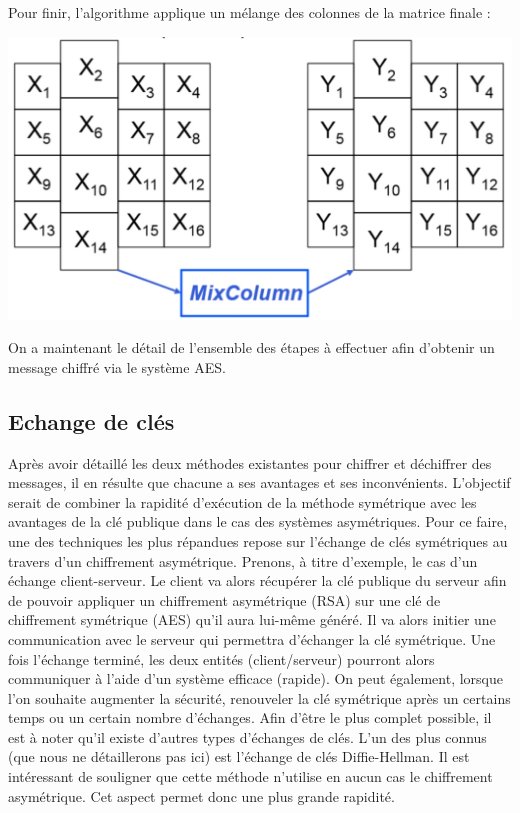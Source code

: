 \documentclass[letterpaper]{article}
\begin{document}
Pour finir, l'algorithme applique un mélange des colonnes de la matrice finale : 
\begin{center}
\includegraphics[scale=0.17]{image4}\\
\end{center}
On a maintenant le détail de l'ensemble des étapes à effectuer afin d'obtenir un message chiffré via le système AES.

\subsection{Echange de clés}
Après avoir détaillé les deux méthodes existantes pour chiffrer et déchiffrer des messages, il en résulte que chacune a ses avantages et ses inconvénients. L'objectif serait de combiner la rapidité d'exécution de la méthode symétrique avec les avantages de la clé publique dans le cas des systèmes asymétriques. Pour ce faire, une des techniques les plus répandues repose sur l'échange de clés symétriques au travers d'un chiffrement asymétrique. Prenons, à titre d'exemple, le cas d'un échange client-serveur. Le client va alors récupérer la clé publique du serveur afin de pouvoir appliquer un chiffrement asymétrique (RSA) sur une clé de chiffrement symétrique (AES) qu'il aura lui-même généré. Il va alors initier une communication avec le serveur qui permettra d'échanger la clé symétrique. Une fois l'échange terminé, les deux entités (client/serveur) pourront alors communiquer à l'aide d'un système efficace (rapide). On peut également, lorsque l'on souhaite augmenter la sécurité, renouveler la clé symétrique après un certains temps ou un certain nombre d'échanges. Afin d'être le plus complet possible, il est à noter qu'il existe d'autres types d'échanges de clés. L'un des plus connus (que nous ne détaillerons pas ici) est l'échange de clés Diffie-Hellman. Il est intéressant de souligner que cette méthode n'utilise en aucun cas le chiffrement asymétrique. Cet aspect permet donc une plus grande rapidité.
\end{document}
